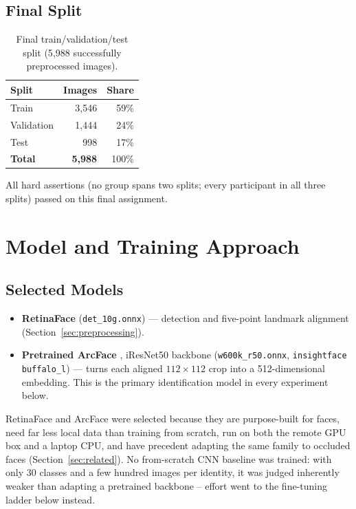 \documentclass[11pt]{article}
\begin{document}
\subsection{Final Split}

\begin{table}[h]
\centering
\caption{Final train/validation/test split (5{,}988 successfully preprocessed images).}
\begin{tabular}{lrr}
\toprule
\textbf{Split} & \textbf{Images} & \textbf{Share} \\
\midrule
Train & 3{,}546 & 59\% \\
Validation & 1{,}444 & 24\% \\
Test & 998 & 17\% \\
\midrule
\textbf{Total} & \textbf{5{,}988} & 100\% \\
\bottomrule
\end{tabular}
\end{table}

All hard assertions (no group spans two splits; every participant in all three splits) passed on this final assignment.

\section{Model and Training Approach}
\label{sec:model}

\subsection{Selected Models}

\begin{itemize}
\item \textbf{RetinaFace} \cite{deng2020retinaface} (\texttt{det\_10g.onnx}) — detection and five-point landmark alignment (Section~\ref{sec:preprocessing}).
\item \textbf{Pretrained ArcFace} \cite{deng2019arcface}, iResNet50 backbone (\texttt{w600k\_r50.onnx}, \texttt{insightface} \texttt{buffalo\_l}) — turns each aligned $112\times112$ crop into a 512-dimensional embedding. This is the primary identification model in every experiment below.
\end{itemize}

RetinaFace and ArcFace were selected because they are purpose-built for faces, need far less local data than training from scratch, run on both the remote GPU box and a laptop CPU, and have precedent adapting the same family to occluded faces (Section~\ref{sec:related}). No from-scratch CNN baseline was trained: with only 30 classes and a few hundred images per identity, it was judged inherently weaker than adapting a pretrained backbone -- effort went to the fine-tuning ladder below instead.
\end{document}

